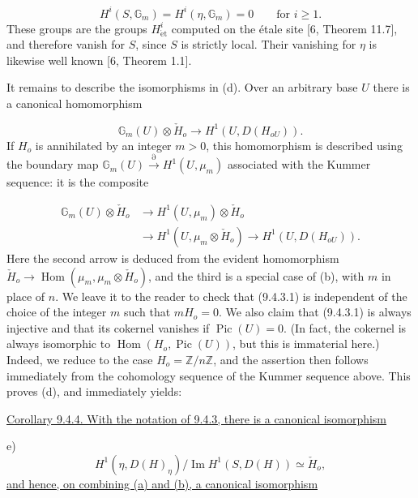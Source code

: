 \begin{equation*}
H^i(S,\mathbb G_m)=H^i(\eta,\mathbb G_m)=0
\qquad\text{for }i\geq1.
\end{equation*}
These groups are the groups $H^i_{\mathrm{\acute et}}$ computed on the
étale site [6, Theorem 11.7], and therefore vanish for $S$, since $S$ is
strictly local. Their vanishing for $\eta$ is likewise well known
[6, Theorem 1.1].

It remains to describe the isomorphisms in (d). Over an arbitrary base $U$
there is a canonical homomorphism

\begin{equation}\tag{9.4.3.1}
\mathbb G_m(U)\otimes\check H_o
\longrightarrow H^1(U,D(H_{oU})).
\end{equation}
If $H_o$ is annihilated by an integer $m>0$, this homomorphism is described
using the boundary map
$\mathbb G_m(U)\xrightarrow{\partial}H^1(U,\mu_m)$ associated with the
Kummer sequence: it is the composite

\begin{equation*}
\begin{aligned}
\mathbb G_m(U)\otimes\check H_o
&\longrightarrow H^1(U,\mu_m)\otimes\check H_o\\
&\longrightarrow H^1(U,\mu_m\otimes\check H_o)
 \longrightarrow H^1(U,D(H_{oU})).
\end{aligned}
\end{equation*}
Here the second arrow is deduced from the evident homomorphism
$\check H_o\longrightarrow
\operatorname{Hom}(\mu_m,\mu_m\otimes\check H_o)$, and the third is a
special case of (b), with $m$ in place of $n$. We leave it to the reader to
check that (9.4.3.1) is independent of the choice of the integer $m$ such
that $mH_o=0$. We also claim that (9.4.3.1) is always injective and that its
cokernel vanishes if $\operatorname{Pic}(U)=0$. (In fact, the cokernel is
always isomorphic to $\operatorname{Hom}(H_o,\operatorname{Pic}(U))$, but
this is immaterial here.) Indeed, we reduce to the case
$H_o=\mathbb Z/n\mathbb Z$, and the assertion then follows immediately from
the cohomology sequence of the Kummer sequence above. This proves (d), and
immediately yields:

\medskip
\noindent
\underline{Corollary 9.4.4. With the notation of 9.4.3, there is a canonical
isomorphism}

\noindent
e)
\begin{equation*}
H^1(\eta,D(H)_\eta)/\operatorname{Im}H^1(S,D(H))
\simeq\check H_o,
\end{equation*}
\underline{and hence, on combining (a) and (b), a canonical isomorphism}

